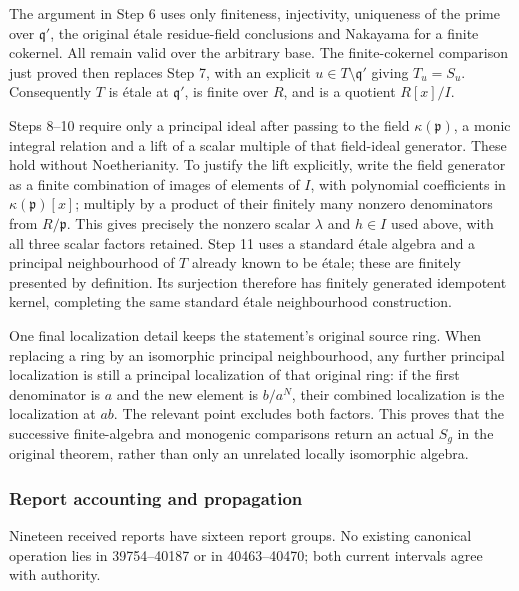 The argument in Step 6 uses only finiteness, injectivity, uniqueness of the prime over \(\mathfrak q'\), the original étale residue-field conclusions and Nakayama for a finite cokernel. All remain valid over the arbitrary base. The finite-cokernel comparison just proved then replaces Step 7, with an explicit \(u\in T\setminus\mathfrak q'\) giving \(T_u=S_u\). Consequently \(T\) is étale at \(\mathfrak q'\), is finite over \(R\), and is a quotient \(R[x]/I\).

Steps 8--10 require only a principal ideal after passing to the field \(\kappa(\mathfrak p)\), a monic integral relation and a lift of a scalar multiple of that field-ideal generator. These hold without Noetherianity. To justify the lift explicitly, write the field generator as a finite combination of images of elements of \(I\), with polynomial coefficients in \(\kappa(\mathfrak p)[x]\); multiply by a product of their finitely many nonzero denominators from \(R/\mathfrak p\). This gives precisely the nonzero scalar \(\lambda\) and \(h\in I\) used above, with all three scalar factors retained. Step 11 uses a standard étale algebra and a principal neighbourhood of \(T\) already known to be étale; these are finitely presented by definition. Its surjection therefore has finitely generated idempotent kernel, completing the same standard étale neighbourhood construction.

One final localization detail keeps the statement's original source ring. When replacing a ring by an isomorphic principal neighbourhood, any further principal localization is still a principal localization of that original ring: if the first denominator is \(a\) and the new element is \(b/a^N\), their combined localization is the localization at \(ab\). The relevant point excludes both factors. This proves that the successive finite-algebra and monogenic comparisons return an actual \(S_g\) in the original theorem, rather than only an unrelated locally isomorphic algebra.

\subsubsection{Report accounting and propagation}\label{algebra-proof-052-report-accounting-and-propagation}

Nineteen received reports have sixteen report groups. No existing canonical operation lies in 39754--40187 or in 40463--40470; both current intervals agree with authority.

